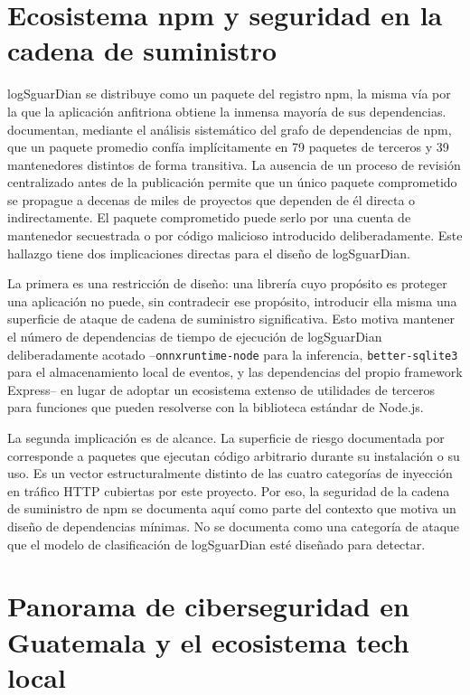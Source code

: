 \FloatBarrier
\section{Ecosistema npm y seguridad en la cadena de suministro}

logSguarDian se distribuye como un paquete del registro npm, la misma vía por la que la aplicación anfitriona obtiene la inmensa mayoría de sus dependencias. \textcite{zimmermann2019} documentan, mediante el análisis sistemático del grafo de dependencias de npm, que un paquete promedio confía implícitamente en 79 paquetes de terceros y 39 mantenedores distintos de forma transitiva. La ausencia de un proceso de revisión centralizado antes de la publicación permite que un único paquete comprometido se propague a decenas de miles de proyectos que dependen de él directa o indirectamente. El paquete comprometido puede serlo por una cuenta de mantenedor secuestrada o por código malicioso introducido deliberadamente. Este hallazgo tiene dos implicaciones directas para el diseño de logSguarDian.

La primera es una restricción de diseño: una librería cuyo propósito es proteger una aplicación no puede, sin contradecir ese propósito, introducir ella misma una superficie de ataque de cadena de suministro significativa. Esto motiva mantener el número de dependencias de tiempo de ejecución de logSguarDian deliberadamente acotado --\texttt{onnxruntime-node} para la inferencia, \texttt{better-sqlite3} para el almacenamiento local de eventos, y las dependencias del propio framework Express-- en lugar de adoptar un ecosistema extenso de utilidades de terceros para funciones que pueden resolverse con la biblioteca estándar de Node.js.

La segunda implicación es de alcance. La superficie de riesgo documentada por \textcite{zimmermann2019} corresponde a paquetes que ejecutan código arbitrario durante su instalación o su uso. Es un vector estructuralmente distinto de las cuatro categorías de inyección en tráfico HTTP cubiertas por este proyecto. Por eso, la seguridad de la cadena de suministro de npm se documenta aquí como parte del contexto que motiva un diseño de dependencias mínimas. No se documenta como una categoría de ataque que el modelo de clasificación de logSguarDian esté diseñado para detectar.

\section{Panorama de ciberseguridad en Guatemala y el ecosistema tech local}

